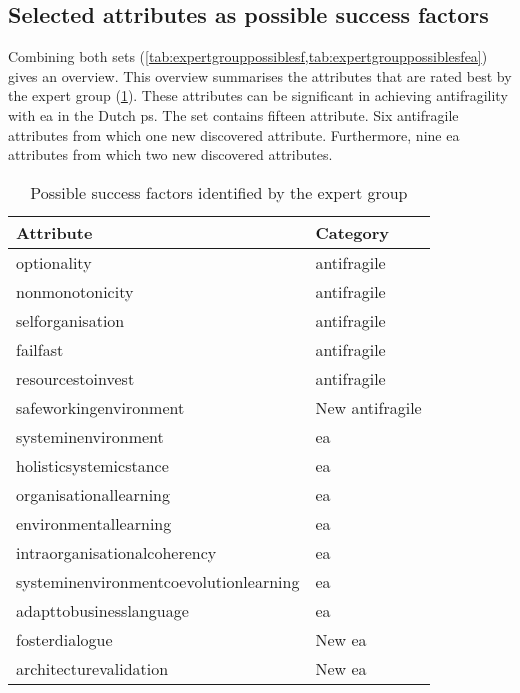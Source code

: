 \subsection{Selected attributes as possible success factors}
\label{sub:validationselectedattributesassf}
Combining both sets (\cref{tab:expertgrouppossiblesf,tab:expertgrouppossiblesfea}) gives an overview. This overview summarises the \glspl{attribute} that are rated best by the expert group (\cref{tab:expertgroupp2ossiblesf}). These \glspl{attribute} can be significant in achieving \gls{antifragility} with \gls{ea} in the Dutch \gls{ps}. The set contains fifteen \gls{attribute}. Six \gls{antifragile} \glspl{attribute} from which one new discovered \gls{attribute}. Furthermore, nine \gls{ea} \glspl{attribute} from which two new discovered \glspl{attribute}.
\begin{longtable}{@{}ll@{}}
	\toprule%
	\textbf{Attribute} & \textbf{Category}  \\%
	\midrule%
	\endhead%
	\hline
	\endfoot%
	\caption[Possible success factors identified by the expert group]{Possible success factors identified by the expert group}
	\label{tab:expertgroupp2ossiblesf}
	\endlastfoot%
	\Gls{optionality} & \Gls{antifragile} \\%
	\Gls{nonmonotonicity} & \Gls{antifragile} \\%
	\Gls{selforganisation} & \Gls{antifragile} \\%
	\Gls{failfast} & \Gls{antifragile} \\%
	\Gls{resourcestoinvest} & \Gls{antifragile} \\%
	\Gls{safeworkingenvironment} & New \Gls{antifragile} \\%
	\Gls{systeminenvironment} & \gls{ea} \\%
	\Gls{holisticsystemicstance} & \gls{ea} \\%
	\Gls{organisationallearning} & \gls{ea} \\%
	\Gls{environmentallearning} & \gls{ea} \\%
	\Gls{intraorganisationalcoherency} & \gls{ea} \\%
	\Gls{systeminenvironmentcoevolutionlearning} & \gls{ea} \\%
	\Gls{adapttobusinesslanguage} & \gls{ea} \\%
	\Gls{fosterdialogue} & New \gls{ea} \\%
	\Gls{architecturevalidation} & New \gls{ea} \\%
	\bottomrule%
\end{longtable}%